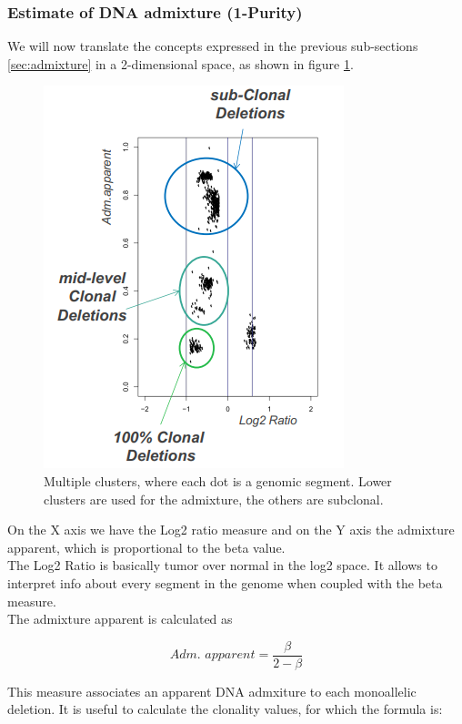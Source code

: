 \subsubsection{Estimate of DNA admixture (1-Purity)}
We will now translate the concepts expressed in the previous sub-sections \ref{sec:admixture} in a 2-dimensional space, as shown in figure \ref{fig:2d}.

\begin{figure}
	\includegraphics[width=0.7\linewidth]{adm.png}
	\caption{Multiple clusters, where each dot is a genomic segment. Lower clusters are used for the admixture, the others are subclonal.}
 \label{fig:2d}
\end{figure}

On the X axis we have the Log2 ratio measure and on the Y axis the admixture apparent, which is proportional to the beta  value.\\
The Log2 Ratio is basically tumor over normal in the log2 space. It allows to interpret info about every segment in the genome when coupled with the beta measure.
\\
The admixture apparent is calculated as

\begin{equation} \label{eq:adm}
\textit{Adm. apparent} = \frac{\beta}{2-\beta}
\end{equation}

This measure associates an apparent DNA admxiture to each monoallelic deletion. It is useful to calculate the clonality values, for which the formula is:

